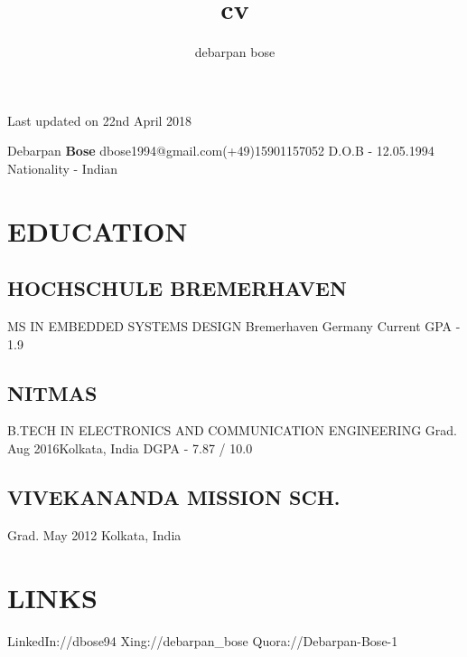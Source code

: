 \documentclass{article}
\makeatletter
\renewcommand{\maketitle}{
\begin{flushleft}
{\huge
\vspace{-2.5cm}
Debarpan \textbf{Bose}\newline
\small dbose1994@gmail.com\hspace{0.1cm}\textbar \hspace{0.1cm}(+49)15901157052\newline
\small D.O.B - 12.05.1994\newline
\small Nationality - Indian\newline
\vspace{0.2cm}
\titlerule
}
\end{flushleft}
}
\makeatother
\begin{document}
\begin{flushright}
\small Last updated on 22nd April 2018
\end{flushright}
\begin{flushright}
\vspace{-0.1cm}
\end{flushright}
\title{cv}
\author{debarpan bose}
\maketitle
\vspace{-0.7cm}
\begin{minipage}[t]{0.39\textwidth}
\vspace{0.3cm}
\section{EDUCATION}
\subsection{HOCHSCHULE BREMERHAVEN}
MS IN EMBEDDED SYSTEMS DESIGN\newline
Bremerhaven Germany\newline
Current GPA - 1.9
\vspace{0.1cm}
\subsection{NITMAS}
B.TECH IN ELECTRONICS AND COMMUNICATION ENGINEERING\newline
Grad. Aug 2016\hspace{0.1cm}\textbar \hspace{0.1cm}Kolkata, India\newline
DGPA - 7.87 / 10.0
\vspace{0.1cm}
\subsection{VIVEKANANDA MISSION SCH.}
Grad. May 2012 \textbar \hspace{0.1cm}Kolkata, India
\vspace{0.3cm}
\section{LINKS}
LinkedIn://dbose94\newline
Xing://debarpan\_bose\newline
Quora://Debarpan-Bose-1
\vspace{0.3cm}

\end{minipage}
\end{document}
